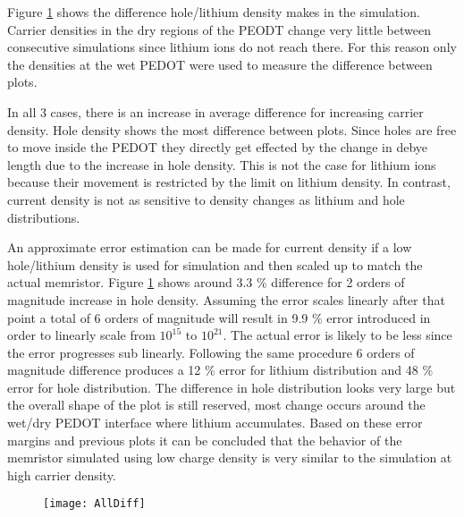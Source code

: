 \begin{doublespace}
Figure \ref{AllDiff} shows the difference hole/lithium density makes in the simulation. Carrier densities in the dry regions of the PEODT change very little between consecutive simulations since lithium ions do not reach there. For this reason only the densities at the wet PEDOT were used to measure the difference between plots. 

In all 3 cases, there is an increase in average difference for increasing carrier density. Hole density shows the most difference between plots. Since holes are free to move inside the PEDOT they directly get effected by the change in debye length due to the increase in hole density. This is not the case for lithium ions because their movement is restricted by the limit on lithium density. In contrast, current density is not as sensitive to density changes as lithium and hole distributions.

 An approximate error estimation can be made for current density if a low hole/lithium density is used for simulation and then scaled up to match the actual memristor. Figure \ref{AllDiff} shows around 3.3 \% difference for 2 orders of magnitude increase in hole density. Assuming the error scales linearly after that point a total of 6 orders of magnitude will result in 9.9 \% error introduced in order to linearly scale from $10^{15}$ to $10^{21}$. The actual error is likely to be less since the error progresses sub linearly. Following the same procedure 6 orders of magnitude difference produces a 12 \% error for lithium distribution and 48 \% error for hole distribution. The difference in hole distribution looks very large but the overall shape of the plot is still reserved, most change occurs around the wet/dry PEDOT interface where lithium accumulates. Based on these error margins and previous plots it can be concluded that the behavior of the memristor simulated using low charge density is very similar to the simulation at high carrier density.    


\begin{figure}[!htp]
\centering
\texttt{[image: AllDiff]}
\caption{} 
\label{AllDiff}
\end{figure}

\end{doublespace}
